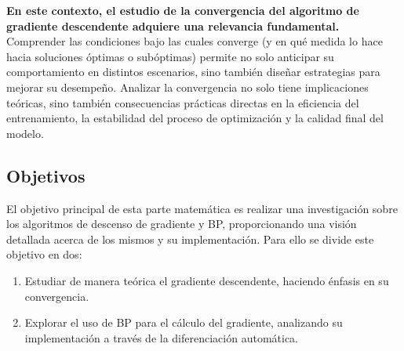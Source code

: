 \textbf{En este contexto, el estudio de la convergencia del algoritmo de gradiente descendente adquiere una relevancia fundamental.} Comprender las condiciones bajo las cuales converge (y en qué medida lo hace hacia soluciones óptimas o subóptimas) permite no solo anticipar su comportamiento en distintos escenarios, sino también diseñar estrategias para mejorar su desempeño. Analizar la convergencia no solo tiene implicaciones teóricas, sino también consecuencias prácticas directas en la eficiencia del entrenamiento, la estabilidad del proceso de optimización y la calidad final del modelo.

\subsection{Objetivos}

El objetivo principal de esta parte matemática es realizar una investigación sobre los algoritmos de descenso de gradiente y BP, proporcionando una visión detallada acerca de los mismos y su implementación. Para ello se divide este objetivo en dos:

\begin{enumerate}

    
    \item Estudiar de manera teórica el gradiente descendente, haciendo énfasis en su convergencia.

    \item Explorar el uso de BP para el cálculo del gradiente, analizando su implementación a través de la diferenciación automática.


\end{enumerate}



